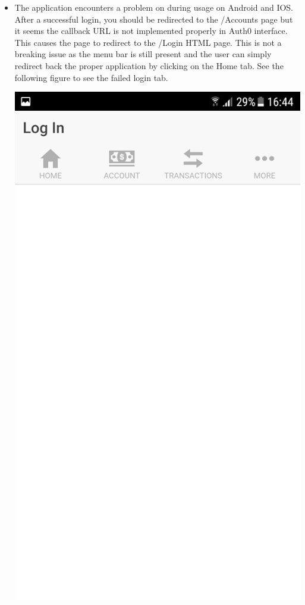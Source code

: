 \begin{itemize}
    \item The application encounters a problem on during usage on Android and IOS. After a successful login, you should be redirected to the /Accounts page but it seems the callback URL is not implemented properly in Auth0 interface. This causes the page to redirect to the /Login HTML page. This is not a breaking issue as the menu bar is still present and the user can simply redirect back the proper application by clicking on the Home tab.
    See the following figure to see the failed login tab.
    \begin{center}
      \includegraphics[scale=0.25]{img/4logingonewrong.png}

\end{center}
\end{itemize}
